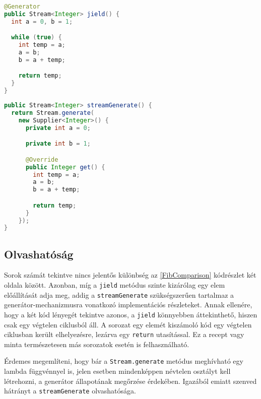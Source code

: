 \begin{center}
\begin{mdframed}[topline=true]
\begin{minipage}[t]{0.45\textwidth}
\begin{lstlisting}[language=Java, breaklines=true, escapechar=!]
@Generator
public Stream<Integer> jield() {
  int a = 0, b = 1;

  while (true) {
    int temp = a;
    a = b;
    b = a + temp;

    return temp;
  }
}
\end{lstlisting}
\end{minipage} 
\begin{minipage}[t]{0.55\textwidth}
\begin{lstlisting}[language=Java, breaklines=true, escapechar=!]
public Stream<Integer> streamGenerate() {
  return Stream.generate(
    new Supplier<Integer>() {
      private int a = 0;

      private int b = 1;

      @Override
      public Integer get() {
        int temp = a;
        a = b;
        b = a + temp;

        return temp;
      }
    });
}
\end{lstlisting} 
\end{minipage}
\end{mdframed}
\label{FibComparison}
\end{center}

\subsection{Olvashatóság}

Sorok számát tekintve nincs jelentős különbség az \ref{FibComparison} kódrészlet két oldala között. Azonban, míg a \texttt{jield} metódus szinte kizárólag egy elem előállítását adja meg, addig a \texttt{streamGenerate} szükségszerűen tartalmaz a generátor-mechanizmusra vonatkozó implementációs részleteket. Annak ellenére, hogy a két kód lényegét tekintve azonos, a \texttt{jield} könnyebben áttekinthető, hiszen csak egy végtelen ciklusból áll. A sorozat egy elemét kiszámoló kód egy végtelen ciklusban került elhelyezésre, lezárva egy \texttt{return} utasítással. Ez a recept vagy minta természetesen más sorozatok esetén is felhasználható.

Érdemes megemlíteni, hogy bár a \texttt{Stream.generate} metódus meghívható egy lambda függvénnyel is, jelen esetben mindenképpen névtelen osztályt kell létrehozni, a generátor állapotának megőrzése érdekében. Igazából emiatt szenved hátrányt a \texttt{streamGenerate} olvashatósága.

